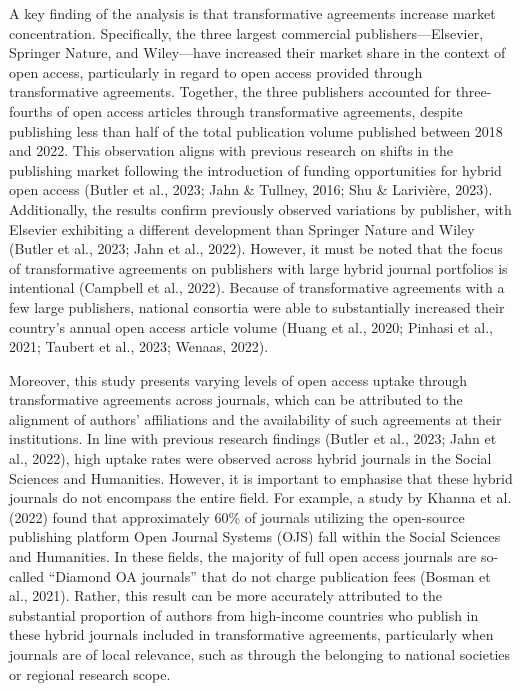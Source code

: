 \documentclass[a4paper,man,floatsintext,longtable,noextraspace,12pt]{apa6}
\begin{document}
A key finding of the analysis is that transformative agreements increase
market concentration. Specifically, the three largest commercial
publishers---Elsevier, Springer Nature, and Wiley---have increased their
market share in the context of open access, particularly in regard to
open access provided through transformative agreements. Together, the
three publishers accounted for three-fourths of open access articles
through transformative agreements, despite publishing less than half of
the total publication volume published between 2018 and 2022. This
observation aligns with previous research on shifts in the publishing
market following the introduction of funding opportunities for hybrid
open access (Butler et al., 2023; Jahn \& Tullney, 2016; Shu \&
Larivière, 2023). Additionally, the results confirm previously observed
variations by publisher, with Elsevier exhibiting a different
development than Springer Nature and Wiley (Butler et al., 2023; Jahn et
al., 2022). However, it must be noted that the focus of transformative
agreements on publishers with large hybrid journal portfolios is
intentional (Campbell et al., 2022). Because of transformative
agreements with a few large publishers, national consortia were able to
substantially increased their country's annual open access article
volume (Huang et al., 2020; Pinhasi et al., 2021; Taubert et al., 2023;
Wenaas, 2022).

Moreover, this study presents varying levels of open access uptake
through transformative agreements across journals, which can be
attributed to the alignment of authors' affiliations and the
availability of such agreements at their institutions. In line with
previous research findings (Butler et al., 2023; Jahn et al., 2022),
high uptake rates were observed across hybrid journals in the Social
Sciences and Humanities. However, it is important to emphasise that
these hybrid journals do not encompass the entire field. For example, a
study by Khanna et al. (2022) found that approximately 60\% of journals
utilizing the open-source publishing platform Open Journal Systems (OJS)
fall within the Social Sciences and Humanities. In these fields, the
majority of full open access journals are so-called ``Diamond OA
journals'' that do not charge publication fees (Bosman et al., 2021).
Rather, this result can be more accurately attributed to the substantial
proportion of authors from high-income countries who publish in these
hybrid journals included in transformative agreements, particularly when
journals are of local relevance, such as through the belonging to
national societies or regional research scope.
\end{document}
